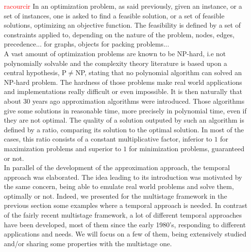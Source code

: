 \documentclass[a4paper]{book}
\newcommand{\alex}[2]{\textcolor{red}{#1}}
\begin{document}
\alex{racourcir}\\
In an optimization problem, as said previously, given an instance, or a set of instances, one is asked to find a feasible solution, or a set of feasible solutions, optimizing an objective function. The feasibility is defined by a set of constraints applied to, depending on the nature of the problem, nodes, edges, precedence... for graphs, objects for packing problems...\\ A vast amount of optimization problems are known to be NP-hard, i.e not polynomially solvable and the complexity theory literature is based upon a central hypothesis, P$\ne$NP, stating that no polynomial algorithm can solved an NP-hard problem. The hardness of those problems make real world applications and implementations really difficult or even impossible. It is then naturally that about 30 years ago approximation algorithms were introduced. Those algorithms give some solutions in reasonable time, more precisely in polynomial time, even if they are not optimal. The quality of a solution outputed by such an algorithm is defined by a ratio, comparing its solution to the optimal solution. In most of the cases, this ratio consists of a constant multiplicative factor, inferior to $1$ for maximization problems and superior to $1$ for minimization problems, guaranteed or not. \\
In parallel of the development of the approximation approach, the temporal approach was elaborated. The idea leading to its introduction was motivated by the same concern, being able to emulate real world problems and solve them, optimally or not. Indeed, we presented for the multistage framework in the previous section some examples where a temporal approach is needed. In contrast of the fairly recent multistage framework, a lot of different temporal approaches have been developed, most of them since the early 1980's, responding to different applications and needs. We will focus on a few of them, being extensively studied and/or sharing some properties with the multistage one. \\
\end{document}
